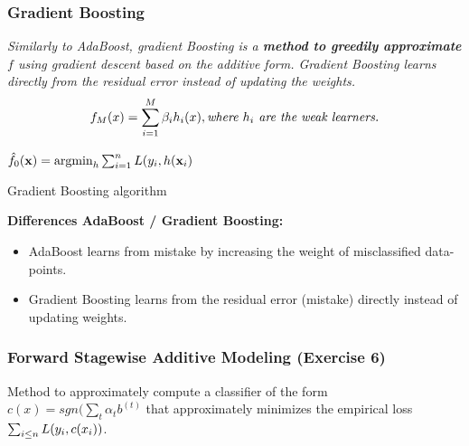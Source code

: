 \subsubsection{Gradient Boosting}
\textit{Similarly to AdaBoost, gradient Boosting is a\textbf{ method to greedily approximate $f$} using gradient descent based on the additive form. Gradient Boosting learns directly from the residual error instead of updating the weights. }
\begin{equation*}
	f_M(x) = \sum_{i = 1}^{M} \beta_i h_i(x), \textit{where $h_i$ are the weak learners.}
\end{equation*}

\begin{algorithm}[H]  
	$\hat f_0(\mathbf x) = \mathop{\mathrm{argmin}}_h \sum_{i = 1}^{n} L(y_i, h(\mathbf x_i)$
	\caption{Gradient Boosting algorithm}
\end{algorithm}

\textbf{Differences AdaBoost / Gradient Boosting: }
\begin{itemize}
	\item AdaBoost learns from mistake by increasing the weight of misclassified data-points.
	\item Gradient Boosting learns from the residual error (mistake) directly instead of updating weights.
\end{itemize}


\subsubsection{Forward Stagewise Additive Modeling (Exercise 6)}
Method to approximately compute a classifier of the form $c(x) = \mathit{sgn}(\sum_t\alpha_t b^{(t)}$ that approximately minimizes the empirical loss $\sum_{i\leq n} L(y_i, c(x_i))$.

